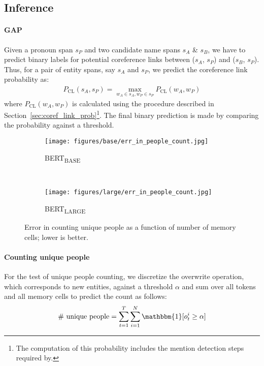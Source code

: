 \documentclass[11pt,a4paper]{article}
\newcommand{\bertbase}{BERT\textsubscript{BASE}\xspace}
\newcommand{\bertlarge}{BERT\textsubscript{LARGE}\xspace}
\begin{document}
\subsection{Inference}
\label{sec:inference}
\paragraph{GAP} Given a pronoun span $s_P$ and two candidate name spans $s_A$ \&  $s_B$, we
have to predict binary labels for potential coreference links between ($s_A$, $s_P$) and ($s_B$, $s_P$). Thus, for a pair of entity spans, say $s_A$ and $s_P$, we predict the coreference link probability as:
\begin{align*}
    P_{\mathrm{CL}}(s_A, s_P) = \max_{w_A \in s_A, w_P \in s_P} P_{\mathrm{CL}}(w_A, w_P)
\end{align*}
where $P_{\mathrm{CL}}(w_A, w_P)$ is calculated using the procedure described in Section~\ref{sec:coref_link_prob}\footnote{The computation of this probability includes the mention detection steps required by\citet{webster2018gap}.}. The final binary prediction is made by comparing the probability against a threshold.


\begin{figure*}[t]
\begin{subfigure}[b]{0.5\textwidth}
        \centering
        \texttt{[image: figures/base/err\_in\_people\_count.jpg]}
        \caption{\bertbase}
        \label{fig:count_uniq_people_small}
    \end{subfigure}~
    \begin{subfigure}[b]{0.5\textwidth}
        \centering
        \texttt{[image: figures/large/err\_in\_people\_count.jpg]}
        \caption{\bertlarge}
        \label{fig:count_uniq_people_large}
    \end{subfigure}
    \caption{Error in counting unique people as a function of number of memory cells; lower is better. }
    \label{fig:count_uniq_people}
    \vspace{-0.1in}
\end{figure*}


\paragraph{Counting unique people}
For the test of unique
people counting, we discretize the overwrite operation, which corresponds to new entities, against a threshold $\alpha$ and sum over all
tokens and all
memory cells to predict the count as follows:\vspace{-0.02in}
$$\text{\# unique people} = \sum_{t=1}^T\sum_{i=1}^N \mathbbm{1}[o^i_t \geq \alpha] $$
\end{document}
